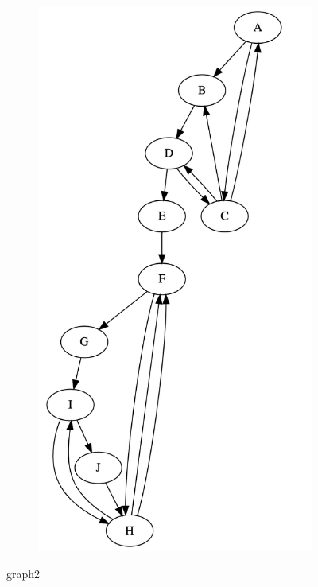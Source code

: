 \documentclass{article}
\begin{document}
\begin{figure}[h!]
  \centering
  \begin{subfigure}[b]{.6\linewidth}
    \includegraphics[width=\linewidth]{graph2.jpg}
  \end{subfigure}
  \caption{graph2 }

  \end{figure}
\end{document}
